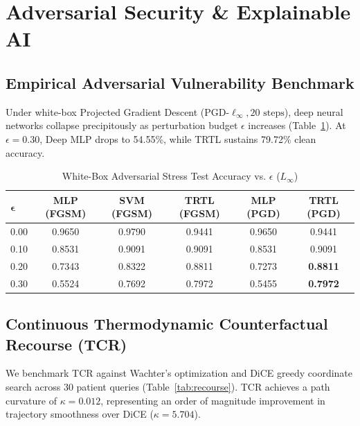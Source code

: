 \documentclass[journal,twoside]{IEEEtran}
\theoremstyle{remark}
\begin{document}
\section{Adversarial Security \& Explainable AI}

\subsection{Empirical Adversarial Vulnerability Benchmark}
Under white-box Projected Gradient Descent ($\text{PGD-}\ell_\infty, 20\text{ steps}$), deep neural networks collapse precipitously as perturbation budget $\epsilon$ increases (Table~\ref{tab:adversarial}). At $\epsilon = 0.30$, Deep MLP drops to 54.55\%, while TRTL sustains 79.72\% clean accuracy.

\begin{table}[!h]
\centering
\caption{White-Box Adversarial Stress Test Accuracy vs. $\epsilon$ ($L_\infty$)}
\label{tab:adversarial}
\small
\begin{tabular}{lccccc}
\toprule
$\boldsymbol{\epsilon}$ & \textbf{MLP (FGSM)} & \textbf{SVM (FGSM)} & \textbf{TRTL (FGSM)} & \textbf{MLP (PGD)} & \textbf{TRTL (PGD)} \\
\midrule
0.00 & 0.9650 & 0.9790 & 0.9441 & 0.9650 & 0.9441 \\
0.10 & 0.8531 & 0.9091 & 0.9091 & 0.8531 & 0.9091 \\
0.20 & 0.7343 & 0.8322 & 0.8811 & 0.7273 & \textbf{0.8811} \\
0.30 & 0.5524 & 0.7692 & 0.7972 & 0.5455 & \textbf{0.7972} \\
\bottomrule
\end{tabular}
\end{table}

\subsection{Continuous Thermodynamic Counterfactual Recourse (TCR)}
We benchmark TCR against Wachter's optimization and DiCE greedy coordinate search across 30 patient queries (Table~\ref{tab:recourse}). TCR achieves a path curvature of $\kappa = 0.012$, representing an order of magnitude improvement in trajectory smoothness over DiCE ($\kappa = 5.704$).
\end{document}

